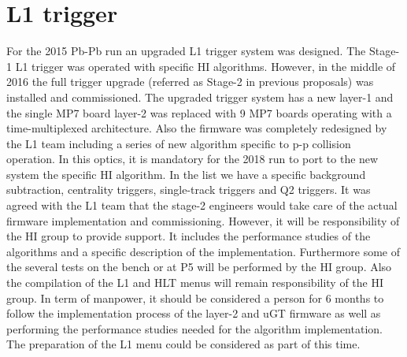 \section{L1 trigger\label{sec:L1Trigger}}
For the 2015 Pb-Pb run an upgraded L1 trigger system was designed. The Stage-1 L1 trigger was operated with specific HI
algorithms. However, in the middle of 2016 the full trigger upgrade (referred as Stage-2 in previous proposals) was
installed and commissioned. The upgraded trigger system has a new layer-1 and the single MP7 board layer-2 was replaced
with 9 MP7 boards operating with a time-multiplexed architecture. Also the firmware was completely redesigned by the L1
team including a series of new algorithm specific to p-p collision operation. In this optics, it is mandatory for the
2018 run to port to the new system the specific HI algorithm. In the list we have a specific background subtraction,
centrality triggers, single-track triggers and Q2 triggers. It was agreed with the L1 team that the stage-2 engineers
would take care of the actual firmware implementation and commissioning. However, it will be responsibility of the HI
group to provide support. It includes the performance studies of the algorithms and a specific description of the
implementation. Furthermore some of the several tests on the bench or at P5 will be performed by the HI group. Also the
compilation of the L1 and HLT menus will remain responsibility of the HI group. In term of manpower, it should be
considered a person for 6 months to follow the implementation process of the layer-2 and uGT firmware as well as
performing the performance studies needed for the algorithm implementation. The preparation of the L1 menu could be
considered as part of this time. 
